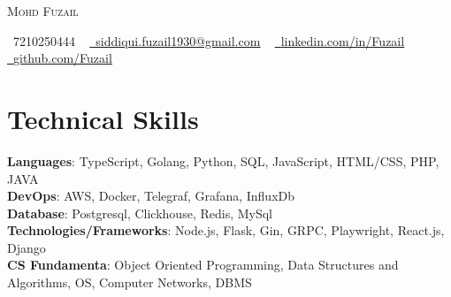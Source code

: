 \documentclass[letterpaper,11pt]{article}
\begin{document}

\begin{center}
    {\Huge \scshape Mohd Fuzail} \\ \vspace{1pt}

    \small \raisebox{-0.1\height}\faPhone\ 7210250444 ~ \href{mailto:siddiqui.fuzail1930@gmail.com}{\raisebox{-0.2\height}\faEnvelope\  \underline{siddiqui.fuzail1930@gmail.com}} ~ 
    \href{https://www.linkedin.com/in/fuzail-siddiqui-198481194/}{\raisebox{-0.2\height}\faLinkedin\ \underline{linkedin.com/in/Fuzail}}  ~
    \href{https://github.com/TheExecuter1}{\raisebox{-0.2\height}\faGithub\ \underline{github.com/Fuzail}}
    \vspace{-8pt}
\end{center}


%
\section{Technical Skills}
 \begin{itemize}[leftmargin=0.15in, label={}]
    \small{\item{
     \textbf{Languages}{: TypeScript, Golang, Python, SQL, JavaScript, HTML/CSS, PHP, JAVA} \\
     \textbf{DevOps}{: AWS, Docker, Telegraf, Grafana, InfluxDb} \\
          \textbf{Database}{: Postgresql, Clickhouse, Redis, MySql} \\
     \textbf{Technologies/Frameworks}{: Node.js, Flask, Gin, GRPC, Playwright, React.js, Django} \\
          \textbf{CS Fundamenta}{: Object Oriented Programming, Data Structures and Algorithms, OS, Computer Networks, DBMS} \\
    }}
 \end{itemize}
 \vspace{-16pt}



\end{document}
